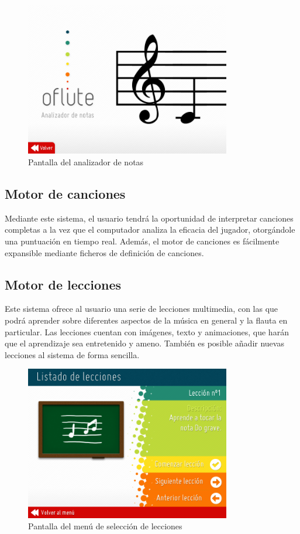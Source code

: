 \documentclass[a4paper,11pt]{article}
\begin{document}
\begin{figure}[h!]
  \centering
  \includegraphics[width=0.8\textwidth]{imagen_seccionAnalizador}
  \caption{Pantalla del analizador de notas}
\end{figure}

\subsection{Motor de canciones}
Mediante este sistema, el usuario tendrá la oportunidad de interpretar canciones
completas a la vez que el computador analiza la eficacia del jugador,
otorgándole una puntuación en tiempo real. Además, el motor de canciones es
fácilmente expansible mediante ficheros de definición de canciones.

\subsection{Motor de lecciones}
Este sistema ofrece al usuario una serie de lecciones multimedia, con las que
podrá aprender sobre diferentes aspectos de la música en general y la flauta en
particular. Las lecciones cuentan con imágenes, texto y animaciones, que harán
que el aprendizaje sea entretenido y ameno. También es posible añadir nuevas
lecciones al sistema de forma sencilla.

\begin{figure}[h!]
  \centering
  \includegraphics[width=0.8\textwidth]{imagen_seccionLecciones1}
  \caption{Pantalla del menú de selección de lecciones}
\end{figure}
\end{document}
